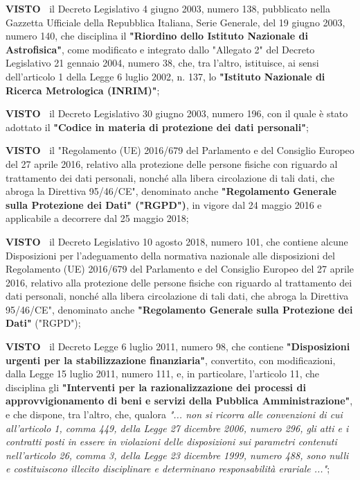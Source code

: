 \textbf{VISTO~}	il Decreto Legislativo 4 giugno 2003, numero 138,
pubblicato nella Gazzetta Ufficiale della Repubblica Italiana, Serie
Generale, del 19 giugno 2003, numero 140, che disciplina il \textbf{"Riordino
dello Istituto Nazionale di Astrofisica"}, come modificato e integrato
dallo "Allegato 2" del Decreto Legislativo 21 gennaio 2004, numero 38,
che, tra l'altro, istituisce, ai sensi dell'articolo 1 della Legge
6 luglio 2002, n. 137, lo \textbf{"Istituto Nazionale di Ricerca Metrologica
(INRIM)"};

\textbf{VISTO~}	il Decreto Legislativo 30 giugno 2003, numero 196, con
il quale è stato adottato il \textbf{"Codice in materia di protezione dei dati
personali"};

\textbf{VISTO~}	il "Regolamento (UE) 2016/679 del Parlamento e del
Consiglio Europeo del 27 aprile 2016, relativo alla protezione delle
persone fisiche con riguardo al trattamento dei dati personali, nonché
alla libera circolazione di tali dati, che abroga la Direttiva 95/46/CE",
denominato anche \textbf{"Regolamento Generale sulla Protezione dei Dati"
("RGPD")}, in vigore dal 24 maggio 2016 e applicabile a decorrere dal 25
maggio 2018;

\textbf{VISTO~}	il Decreto Legislativo 10 agosto 2018, numero 101,
che contiene alcune Disposizioni per l'adeguamento della normativa
nazionale alle disposizioni del Regolamento (UE) 2016/679 del Parlamento
e del Consiglio Europeo del 27 aprile 2016, relativo alla protezione
delle persone fisiche con riguardo al trattamento dei dati personali,
nonché alla libera circolazione di tali dati, che abroga la Direttiva
95/46/CE", denominato anche \textbf{"Regolamento Generale sulla Protezione dei
Dati"} ("RGPD");

\textbf{VISTO~}	il Decreto Legge 6 luglio 2011, numero 98, che contiene
\textbf{"Disposizioni urgenti per la stabilizzazione finanziaria"}, convertito,
con modificazioni, dalla Legge 15 luglio 2011, numero 111, e, in
particolare, l'articolo 11, che disciplina gli \textbf{"Interventi per la
razionalizzazione dei processi di approvvigionamento di beni e servizi
della Pubblica Amministrazione"}, e che dispone, tra l'altro, che,
qualora \textit{"... non si ricorra alle convenzioni di cui all'articolo
1, comma 449, della Legge 27 dicembre 2006, numero 296, gli atti e i
contratti posti in essere in violazioni delle disposizioni sui parametri
contenuti nell'articolo 26, comma 3, della Legge 23 dicembre 1999,
numero 488, sono nulli e costituiscono illecito disciplinare e determinano
responsabilità erariale ..."};

